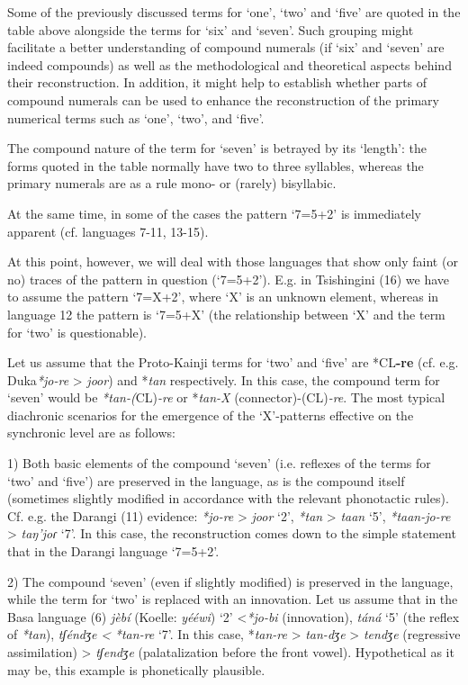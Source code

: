 Some of the previously discussed terms for ‘one’, ‘two’ and ‘five’ are quoted in the table above alongside the terms for ‘six’ and ‘seven’. Such grouping might facilitate a better understanding of compound numerals (if ‘six’ and ‘seven’ are indeed compounds) as well as the methodological and theoretical aspects behind their reconstruction. In addition, it might help to establish whether parts of compound numerals can be used to enhance the reconstruction of the primary numerical terms such as ‘one’, ‘two’, and ‘five’.

The compound nature of the term for ‘seven’ is betrayed by its ‘length’: the forms quoted in the table normally have two to three syllables, whereas the primary numerals are as a rule mono- or (rarely) bisyllabic.

At the same time, in some of the cases the pattern ‘7=5+2’ is immediately apparent (cf. languages 7-11, 13-15). 

At this point, however, we will deal with those languages that show only faint (or no) traces of the pattern in question (‘7=5+2’). E.g. in Tsishingini (16) we have to assume the pattern ‘7=X+2’, where ‘X’ is an unknown element, whereas in language 12 the pattern is ‘7=5+X’ (the relationship between ‘X’ and the term for ‘two’ is questionable). 

Let us assume that the Proto-Kainji terms for ‘two’ and ‘five’ are *CL\textbf{-re}  (cf. e.g. Duka\textit{*jo-re} > \textit{joor}) and *\textit{tan} respectively. In this case, the compound term for ‘seven’ would be \textit{*tan-(}CL)\textit{-re} or *\textit{tan-X} (connector)-(CL)\textit{-re}. The most typical diachronic scenarios for the emergence of the ‘X’-patterns effective on the synchronic level are as follows:

1) Both basic elements of the compound ‘seven’ (i.e. reflexes of the terms for ‘two’ and ‘five’) are preserved in the language, as is the compound itself (sometimes slightly modified in accordance with the relevant phonotactic rules). Cf. e.g. the Darangi (11) evidence: \textit{*jo-re} > \textit{joor} ‘2’, \textit{*tan} > \textit{taan} ‘5’, \textit{*taan-jo-re} > \textit{taŋ’joɾ} ‘7’. In this case, the reconstruction comes down to the simple statement that in the Darangi language ‘7=5+2’.

2) The compound ‘seven’ (even if slightly modified) is preserved in the language, while the term for ‘two’ is replaced with an innovation. Let us assume that in the Basa language (6) \textit{jèbí} (Koelle: \textit{yééwi}) ‘2’ <\textit{*jo-bi} (innovation), \textit{táná} ‘5’ (the reflex of \textit{*tan}), \textit{tʃéndʒe} \textit{<} \textit{*tan-re} ‘7’. In this case, *\textit{tan-re} > \textit{tan-dʒe} > \textit{tendʒe} (regressive assimilation) > \textit{tʃendʒe} (palatalization before the front vowel). Hypothetical as it may be, this example is phonetically plausible.


